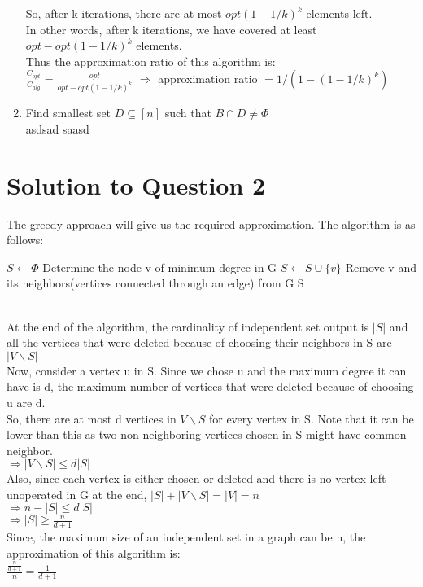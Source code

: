 \documentclass[11pt]{article}
\begin{document}
\begin{enumerate}
So, after k iterations, there are at most $opt(1 - 1/k)^k$ elements left. \\
In other words, after k iterations, we have covered at least $opt - opt(1 - 1/k)^k$ elements. \\
Thus the approximation ratio of this algorithm is: \\
$\frac{C_{opt}}{C_{alg}} = \frac{opt}{opt - opt(1- 1/k)^k} $
$\Longrightarrow$ approximation ratio $= 1/(1 - (1 - 1/k)^k)$
    \item Find smallest set $D \subseteq [n]$ such that $B \cap D \neq \Phi $ \\
    asdsad
    saasd   
\end{enumerate}

\newpage
\section{Solution to Question 2}
The greedy approach will give us the required approximation. The algorithm is as follows:
    \begin{algorithm}
  \begin{algorithmic}
      \State $S \leftarrow \Phi$
          \State Determine the node v of minimum degree in G
          \State $S \leftarrow S \cup \{v\}$
          \State Remove v and its neighbors(vertices connected through an edge) from G
      \EndWhile
      \State \Return S
    \EndFunction
  \end{algorithmic}
\end{algorithm}\\
At the end of the algorithm, the cardinality of independent set output is $|S|$ and all the vertices that were deleted because of choosing their neighbors in S are $|V \backslash S|$ \\
Now, consider a vertex u in S. Since we chose u and the maximum degree it can have is d, the maximum number of vertices that were deleted because of choosing u are d. \\
So, there are at most d vertices in $V \backslash S$ for every vertex in S. Note that it can be lower than this as two non-neighboring vertices chosen in S might have common neighbor. \\
$\Longrightarrow |V \backslash S| \leq d|S| $ \\
Also, since each vertex is either chosen or deleted and there is no vertex left unoperated in G at the end, $|S| + |V \backslash S| = |V| = n$ \\
$\Longrightarrow n - |S| \leq d|S|$ \\
$\Longrightarrow |S| \geq \frac{n}{d+1}$ \\
Since, the maximum size of an independent set in a graph can be n, the approximation of this algorithm is: \\
$\frac{\frac{n}{d+1}}{n} = \frac{1}{d+1}$
\newpage
\end{document}
